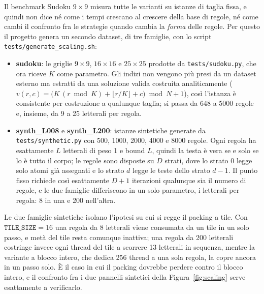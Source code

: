 \documentclass[11pt,a4paper]{article}
\begin{document}
Il benchmark Sudoku $9\times9$ misura tutte le varianti su istanze di taglia fissa, e quindi non
dice né come i tempi crescano al crescere della base di regole, né come cambi il confronto fra le
strategie quando cambia la \emph{forma} delle regole. Per questo il progetto genera un secondo
dataset, di tre famiglie, con lo script \texttt{tests/generate\_scaling.sh}:

\begin{itemize}
\item \textbf{sudoku}: le griglie $9\times9$, $16\times16$ e $25\times25$ prodotte da
\texttt{tests/sudoku.py}, che ora riceve $K$ come parametro. Gli indizi non vengono più presi da un
dataset esterno ma estratti da una soluzione valida costruita analiticamente
($v(r,c) = \big(K\,(r \bmod K) + \lfloor r/K \rfloor + c\big) \bmod N + 1$), così l'istanza è
consistente per costruzione a qualunque taglia; si passa da 648 a 5000 regole e, insieme, da 9 a 25
letterali per regola.

\item \textbf{synth\_L008} e \textbf{synth\_L200}: istanze sintetiche generate da
\texttt{tests/synthetic.py} con 500, 1000, 2000, 4000 e 8000 regole. Ogni regola ha esattamente $L$
letterali di peso 1 e bound $L$, quindi la testa è vera se e solo se lo è tutto il corpo; le regole
sono disposte su $D$ strati, dove lo strato 0 legge solo atomi già assegnati e lo strato $d$ legge
le teste dello strato $d-1$. Il punto fisso richiede così esattamente $D+1$ iterazioni qualunque sia
il numero di regole, e le due famiglie differiscono in un solo parametro, i letterali per regola: 8
in una e 200 nell'altra.
\end{itemize}

Le due famiglie sintetiche isolano l'ipotesi su cui si regge il packing a tile. Con
$\texttt{TILE\_SIZE} = 16$ una regola da 8 letterali viene consumata da un tile in un solo passo, e
metà del tile resta comunque inattiva; una regola da 200 letterali costringe invece ogni thread del
tile a scorrere 13 letterali in sequenza, mentre la variante a blocco intero, che dedica 256 thread
a una sola regola, la copre ancora in un passo solo. È il caso in cui il packing dovrebbe perdere
contro il blocco intero, e il confronto fra i due pannelli sintetici della Figura~\ref{fig:scaling}
serve esattamente a verificarlo.
\end{document}
